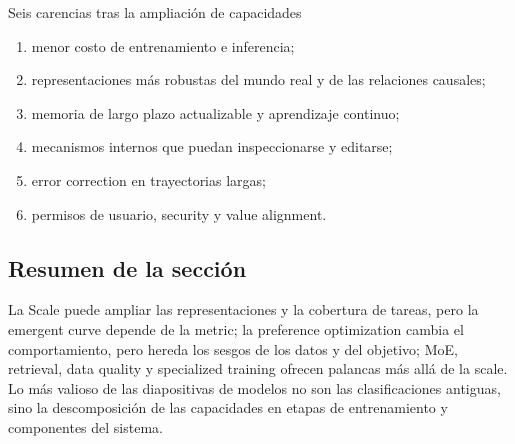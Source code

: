 \begin{importantbox}{Seis carencias tras la ampliación de capacidades}
\begin{enumerate}
  \item menor costo de entrenamiento e inferencia;
  \item representaciones más robustas del mundo real y de las relaciones causales;
  \item memoria de largo plazo actualizable y aprendizaje continuo;
  \item mecanismos internos que puedan inspeccionarse y editarse;
  \item error correction en trayectorias largas;
  \item permisos de usuario, security y value alignment.
\end{enumerate}
\end{importantbox}

\subsection{Resumen de la sección}

La Scale puede ampliar las representaciones y la cobertura de tareas, pero la emergent curve depende de la metric; la preference optimization cambia el comportamiento, pero hereda los sesgos de los datos y del objetivo; MoE, retrieval, data quality y specialized training ofrecen palancas más allá de la scale. Lo más valioso de las diapositivas de modelos no son las clasificaciones antiguas, sino la descomposición de las capacidades en etapas de entrenamiento y componentes del sistema.
